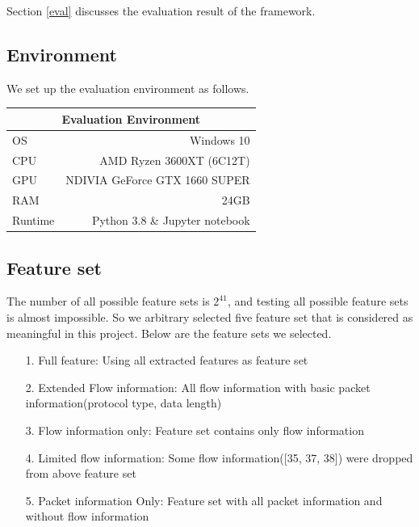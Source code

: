 \documentclass[fontsize=10pt]{article}
\begin{document}
Section \ref{eval} discusses the evaluation result of the framework.

\subsection{Environment}
We set up the evaluation environment as follows.
\begin{center}
		\begin{tabular}{|l|r|}
			\multicolumn{2}{c}{\textbf{\large Evaluation Environment}} \\ \hline
			{OS}  & Windows 10  \\ \hline
			{CPU} & AMD Ryzen 3600XT (6C12T)  \\ \hline
			{GPU} & NDIVIA GeForce GTX 1660 SUPER  \\ \hline
			{RAM} & 24GB     \\ \hline
			{Runtime} & Python 3.8 \& Jupyter notebook     \\ \hline
		\end{tabular}
\end{center}

\subsection{Feature set}

The number of all possible feature sets is $2^{41}$, and testing all possible feature sets is almost impossible. So we arbitrary selected five feature set that is considered as meaningful in this project. Below are the feature sets we selected.
\begin{itemize}
    \item [1.] Full feature: Using all extracted features as feature set
    \item [2.] Extended Flow information: All flow information with basic packet information(protocol type, data length)
    \item [3.] Flow information only: Feature set contains only flow information
    \item [4.] Limited flow information: Some flow information([35, 37, 38]) were dropped from above feature set
    \item [5.] Packet information Only:  Feature set with all packet information and without flow information
\end{itemize}
\end{document}
